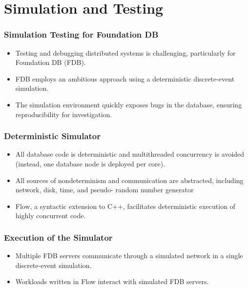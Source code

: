\section{Simulation and Testing }

\begin{frame}
    \frametitle{Simulation Testing for Foundation DB}
    \begin{itemize}
        \item Testing and debugging distributed systems is challenging, particularly for Foundation DB (FDB).
        \item FDB employs an ambitious approach using a deterministic discrete-event simulation.
        \item The simulation environment quickly exposes bugs in the database, ensuring reproducibility for investigation.
    \end{itemize}
\end{frame}
\begin{frame}
    \frametitle{Deterministic Simulator}
    \begin{itemize}
        \item All database
code is deterministic and multithreaded concurrency is
avoided (instead, one database node is deployed per core).
        \item All sources of nondeterminism and communication are
abstracted, including network, disk, time, and pseudo-
random number generator
        \item Flow, a syntactic extension to C++, facilitates deterministic execution of highly concurrent code.
    \end{itemize}
\end{frame}
\begin{frame}
    \frametitle{Execution of the Simulator}
    \begin{itemize}
        \item Multiple FDB servers communicate through a simulated network in a single discrete-event simulation.
        \item Workloads written in Flow interact with simulated FDB servers.
    \end{itemize}
\end{frame}

